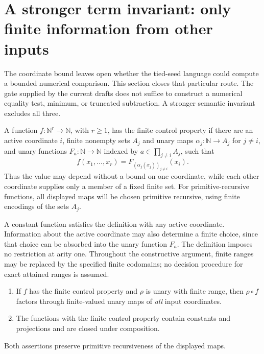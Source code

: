 
\section{A stronger term invariant: only finite information from other inputs}
\label{sec:finite-control}

The coordinate bound leaves open whether the tied-seed language could
compute a bounded numerical comparison. This section closes that
particular route. The gate supplied by the current drafts does not
suffice to construct a numerical equality test, minimum, or truncated
subtraction. A stronger semantic invariant excludes all three.

\begin{definition}
\label{fc:def}
A function $f:\mathbb N^r\to\mathbb N$, with $r\ge1$, has the finite
control property if there are an active coordinate $i$, finite nonempty
sets $A_j$ and unary maps $\alpha_j:\mathbb N\to A_j$ for $j\ne i$,
and unary functions $F_a:\mathbb N\to\mathbb N$ indexed by
$a\in\prod_{j\ne i}A_j$, such that
\[
 f(x_1,\ldots,x_r)
   =F_{(\alpha_j(x_j))_{j\ne i}}(x_i).
 \tag{FC}\label{fc:form}
\]
Thus the value may depend without a bound on one coordinate, while each
other coordinate supplies only a member of a fixed finite set. For
primitive-recursive functions, all displayed maps will be chosen
primitive recursive, using finite encodings of the sets $A_j$.
\end{definition}

A constant function satisfies the definition with any active coordinate.
Information about the active coordinate may also determine a finite
choice, since that choice can be absorbed into the unary function
$F_a$. The definition imposes no restriction at arity one.
Throughout the constructive argument, finite ranges may be replaced by
the specified finite codomains; no decision procedure for exact attained
ranges is assumed.

\begin{lemma}
\label{fc:composition}
\begin{enumerate}
\item If $f$ has the finite control property and $\rho$ is unary with
      finite range, then $\rho\circ f$ factors through finite-valued
      unary maps of \emph{all} input coordinates.
\item The functions with the finite control property contain constants
      and projections and are closed under composition.
\end{enumerate}
Both assertions preserve primitive recursiveness of the displayed maps.
\end{lemma}

